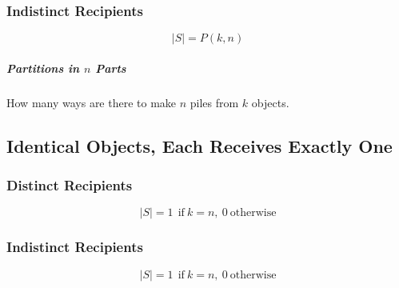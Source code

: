 \subsubsection{Indistinct Recipients}

\begin{equation}
|S| = P(k,n)
\end{equation}

\subparagraph{Partitions in $n$ Parts} How many ways are there to make $n$ piles from $k$ objects.

\subsection{Identical Objects, Each Receives Exactly One}

\subsubsection{Distinct Recipients}

\begin{equation}
|S| = 1\ \ \mathrm{if\ }k = n,\ 0\ \mathrm{otherwise}
\end{equation}  

\subsubsection{Indistinct Recipients}

\begin{equation}
|S| = 1\ \ \mathrm{if\ }k = n,\ 0\ \mathrm{otherwise}
\end{equation}  

\chapauthor{}








